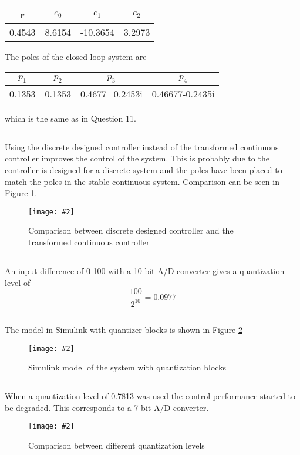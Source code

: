 \documentclass[12pt,a4paper]{article}
\newcommand{\fig}[4]{
    \begin{figure}[!h]
      \centering
      \texttt{[image: \#2]}
        \label{fig:#3}
        \caption{#4}
    \end{figure}
}
\begin{document}
\begin{center}
	\begin{tabular}{| c | c | c | c |}
	\hline
	r & $c_0$ & $c_1$ & $c_2$ \\
	\hline
	0.4543 & 8.6154 & -10.3654 & 3.2973 \\
	\hline
	\end{tabular}
\end{center}

The poles of the closed loop system are
\begin{center}
	\begin{tabular}{| c | c | c | c |}
	\hline
	$p_1$ & $p_2$ & $p_3$ & $p_4$ \\
	\hline
	0.1353 & 0.1353 & 0.4677+0.2453i & 0.46677-0.2435i\\
	\hline
	\end{tabular}
\end{center}
which is the same as in Question 11.

\subsection{}%
Using the discrete designed controller instead of the transformed continuous controller improves the control of the system. This is probably due to the controller is designed for a discrete system and the poles have been placed to match the poles in the stable continuous system. Comparison can be seen in Figure \ref{fig:ex17}.

\fig{0.4}{ex17.png}{ex17}{Comparison between discrete designed controller and the transformed continuous controller}

\subsection{}%
An input difference of 0-100 with a 10-bit A/D converter gives a quantization level of
\begin{equation}
	\frac{100}{2^{10}} = 0.0977
\end{equation}

\subsection{}%
The model in Simulink with quantizer blocks is shown in Figure \ref{fig:ex19}
\fig{0.6}{ex19.png}{ex19}{Simulink model of the system with quantization blocks}

\subsection{}%
When a quantization level of 0.7813 was used the control performance started to be degraded. This corresponds to a 7 bit A/D converter.

\fig{1}{ex20.png}{ex20}{Comparison between different quantization levels}
\end{document}

